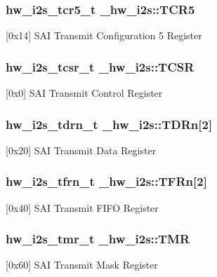 \subsubsection[{\texorpdfstring{T\+C\+R5}{TCR5}}]{ {\bf hw\+\_\+i2s\+\_\+tcr5\+\_\+t} \+\_\+hw\+\_\+i2s\+::\+T\+C\+R5}\hypertarget{struct__hw__i2s_aeb5da5c10cc6ca6d2d0aae65f1a462d6}{}\label{struct__hw__i2s_aeb5da5c10cc6ca6d2d0aae65f1a462d6}
\mbox{[}0x14\mbox{]} S\+AI Transmit Configuration 5 Register 
\subsubsection[{\texorpdfstring{T\+C\+SR}{TCSR}}]{ {\bf hw\+\_\+i2s\+\_\+tcsr\+\_\+t} \+\_\+hw\+\_\+i2s\+::\+T\+C\+SR}\hypertarget{struct__hw__i2s_ae5fbb438abfcde15c08c24c2b042f581}{}\label{struct__hw__i2s_ae5fbb438abfcde15c08c24c2b042f581}
\mbox{[}0x0\mbox{]} S\+AI Transmit Control Register 
\subsubsection[{\texorpdfstring{T\+D\+Rn}{TDRn}}]{ {\bf hw\+\_\+i2s\+\_\+tdrn\+\_\+t} \+\_\+hw\+\_\+i2s\+::\+T\+D\+Rn\mbox{[}2\mbox{]}}\hypertarget{struct__hw__i2s_a8cac04b33dae24a80386777263a65711}{}\label{struct__hw__i2s_a8cac04b33dae24a80386777263a65711}
\mbox{[}0x20\mbox{]} S\+AI Transmit Data Register 
\subsubsection[{\texorpdfstring{T\+F\+Rn}{TFRn}}]{ {\bf hw\+\_\+i2s\+\_\+tfrn\+\_\+t} \+\_\+hw\+\_\+i2s\+::\+T\+F\+Rn\mbox{[}2\mbox{]}}\hypertarget{struct__hw__i2s_aae9998380559bc3f684354ddf8d9611a}{}\label{struct__hw__i2s_aae9998380559bc3f684354ddf8d9611a}
\mbox{[}0x40\mbox{]} S\+AI Transmit F\+I\+FO Register 
\subsubsection[{\texorpdfstring{T\+MR}{TMR}}]{ {\bf hw\+\_\+i2s\+\_\+tmr\+\_\+t} \+\_\+hw\+\_\+i2s\+::\+T\+MR}\hypertarget{struct__hw__i2s_a8348f19bb88fe140e5235c1fd5292c0c}{}\label{struct__hw__i2s_a8348f19bb88fe140e5235c1fd5292c0c}
\mbox{[}0x60\mbox{]} S\+AI Transmit Mask Register 

